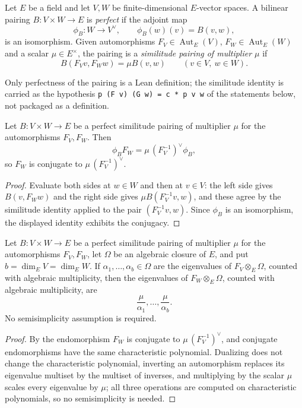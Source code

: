 \begin{definition}
\label{def:zla-similitude-pairing}
Let $E$ be a field and let $V,W$ be finite-dimensional $E$-vector spaces.  A
bilinear pairing $B:V\times W\to E$ is \emph{perfect} if the adjoint map
\[
  \phi_B:W\longrightarrow V^\vee,
  \qquad
  \phi_B(w)(v)=B(v,w),
\]
is an isomorphism.  Given automorphisms $F_V\in\operatorname{Aut}_E(V)$,
$F_W\in\operatorname{Aut}_E(W)$ and a scalar $\mu\in E^\times$, the pairing is
a \emph{similitude pairing of multiplier $\mu$} if
\[
  B(F_Vv,F_Ww)=\mu B(v,w)
  \qquad(v\in V,\ w\in W).
\]
\end{definition}

Only perfectness of the pairing is a Lean definition; the similitude
identity is carried as the hypothesis \texttt{p (F v) (G w) = c * p v w} of
the statements below, not packaged as a definition.

\begin{lemma}
\label{lem:zla-adjoint-conjugacy}
\leanok
Let $B:V\times W\to E$ be a perfect similitude pairing of multiplier $\mu$ for
the automorphisms $F_V,F_W$.  Then
\[
  \phi_BF_W=\mu\,(F_V^{-1})^\vee\phi_B,
\]
so $F_W$ is conjugate to $\mu\,(F_V^{-1})^\vee$.
\end{lemma}
\begin{proof}
\leanok
Evaluate both sides at $w\in W$ and then at $v\in V$: the left side gives
$B(v,F_Ww)$ and the right side gives $\mu B(F_V^{-1}v,w)$, and these agree by
the similitude identity applied to the pair $(F_V^{-1}v,w)$.  Since $\phi_B$
is an isomorphism, the displayed identity exhibits the conjugacy.
\end{proof}

\begin{proposition}
\label{prop:zla-reciprocal-eigenvalue-pairing}
Let $B:V\times W\to E$ be a perfect similitude pairing of multiplier $\mu$ for
the automorphisms $F_V,F_W$, let $\Omega$ be an algebraic closure of $E$, and
put $b=\dim_EV=\dim_EW$.  If $\alpha_1,\ldots,\alpha_b\in\Omega$ are the
eigenvalues of $F_V\otimes_E\Omega$, counted with algebraic multiplicity, then
the eigenvalues of $F_W\otimes_E\Omega$, counted with algebraic multiplicity,
are
\[
  \frac{\mu}{\alpha_1},\ldots,\frac{\mu}{\alpha_b}.
\]
No semisimplicity assumption is required.
\end{proposition}
\begin{proof}
By  the endomorphism $F_W$ is conjugate to
$\mu\,(F_V^{-1})^\vee$, and conjugate endomorphisms have the same
characteristic polynomial.  Dualizing does not change the characteristic
polynomial, inverting an automorphism replaces its eigenvalue multiset by the
multiset of inverses, and multiplying by the scalar $\mu$ scales every
eigenvalue by $\mu$; all three operations are computed on characteristic
polynomials, so no semisimplicity is needed.
\end{proof}

